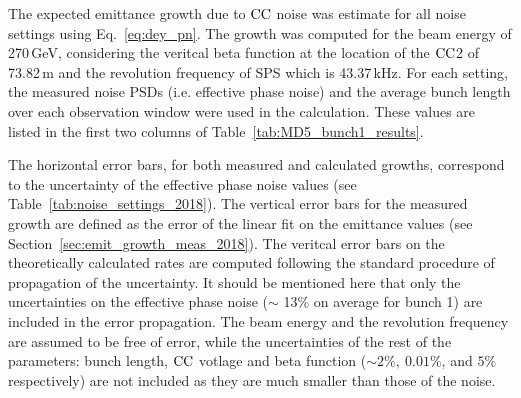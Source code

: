 The expected emittance growth due to ${\mathrm{CC}}$ noise was estimate for all noise settings using Eq.~\eqref{eq:dey_pn}. The growth was computed for the beam energy of 270\,GeV, considering the veritcal beta function at the location of the ${\mathrm{CC}}$2 of 73.82\,m and the revolution frequency of SPS which is 43.37\,kHz. For each setting, the measured noise PSDs (i.e. effective phase noise) and the average bunch length over each observation window were used in the calculation. These values are listed in the first two columns of Table~\ref{tab:MD5_bunch1_results}.

The horizontal error bars, for both measured and calculated growths, correspond to the uncertainty of the effective phase noise values (see Table~\ref{tab:noise_settings_2018}). The vertical error bars for the measured growth are defined as the error of the linear fit on the emittance values (see Section~\ref{sec:emit_growth_meas_2018}). The veritcal error bars on the theoretically calculated rates are computed following the standard procedure of propagation of the uncertainty. It should be mentioned here that only the uncertainties on the effective phase noise ($\sim$ 13\% on average for bunch 1) are included in the error propagation. The beam energy and the revolution frequency are assumed to be free of error, while the uncertainties of the rest of the parameters: bunch length, ${\mathrm{CC}}$ votlage and beta function ($\sim 2 \%, \ 0.01 \%$, and $5 \%$ respectively) are not included as they are much smaller than those of the noise.




